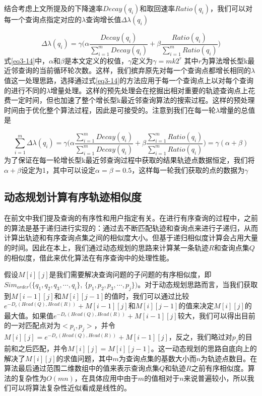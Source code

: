 结合考虑上文所提及的下降速率$Decay(q_i)$和取回速率$Ratio(q_i)$，我们可以对每一个查询点指定对应的$\lambda$查询增长值$\Delta\lambda(q_i)$

\begin{equation}
\label{eq3-14}
\Delta\lambda(q_i) = \gamma\big( \alpha\frac{Decay(q_i)}{\sum_{i=1}^{m}Decay(q_i)} + \beta\frac{Ratio(q_i)}{\sum_{i=1}^{m}Ratio(q_i)} \big)
\end{equation}
式\ref{eq3-14}中，$\alpha$和$\beta$是本文定义的权值，$\gamma$定义为$\gamma = mk2^{r}$ 其中$r$为算法增长型k最近邻查询的当前循环轮次数。这样，我们摈弃原先对每一个查询点都增长相同的$\lambda$值这一处理思路，选择通过式\ref{eq3-14}的方法应用于每一个查询点上以对每个查询的进行不同的$\lambda$增量处理。这样的预先处理会在挖掘出相对重要的轨迹查询点上花费一定时间，但也加速了整个增长型k最近邻查询算法的搜索过程。这样的预处理时间由于优化整个算法过程，因此是可接受的。注意到我们在每一轮$\lambda$增量的总值是

\begin{displaymath}
\sum_{i=1}^{m}\Delta\lambda(q_i)=\gamma\big( \alpha\frac{\sum_{i=1}^{m}Decay(q_i)}{\sum_{i=1}^{m}Decay(q_i)} + \beta\frac{\sum_{i=1}^{m}Ratio(q_i)}{\sum_{i=1}^{m}Ratio(q_i)} \big)=\gamma(\alpha+\beta)
\end{displaymath}
为了保证在每一轮增长型k最近邻查询过程中获取的结果轨迹点数据恒定，我们将$\alpha+\beta$设定为1，其中可以设定$\alpha=\beta=0.5$，这样每一轮我们获取的点的数据为$\gamma$

\subsection{动态规划计算有序轨迹相似度}
\label{subsec:dp-order-sim}
在前文中我们提及查询的有序性和用户指定有关。在进行有序查询的过程中，之前的算法是基于递归进行实现的：通过去不断匹配轨迹和查询点来进行子递归，从而计算出轨迹和有序查询点集之间的相似度大小。但基于递归相似度计算会占用大量的时间。因此在本上，我们通过动态规划的思路来计算某一条轨迹$R$和查询点集$Q$的相似度，借此来优化算法在有序查询中的处理性能。

假设$M[i][j]$是我们需要解决查询问题的子问题的有序相似度，即$Sim_{order}(\{q_1,q_2,q_3,\cdots,q_i\}$, $\{p_1,p_2,p_3,\cdots,p_j\})$。对于动态规划思路而言，当我们获取到$M[i-1][j]$和$M[i][j-1]$的值时，我们可以通过比较$e^{-D_{e}(Head(Q),Head(R))} + M[i-1][j]$和$M[i][j-1]$的值来决定$M[i][j]$的最大值。如果值$e^{-D_{e}(Head(Q),Head(R))} + M[i-1][j]$较大，我们可以得出目前的一对匹配点对为$<p_i, p_j>$，并令$M[i][j] = e^{-D_{e}(Head(Q),Head(R))} + M[i-1][j]$，反之，我们略过对$p_j$的目前和之后匹配，并令$M[i][j]=M[i][j-1]$。这一动态规划的思路自底向上的解决了$M[i][j]$的求值问题，其中$m$为查询点集的基数大小而$n$为轨迹点数目。在算法最后通过范围二维数组中的值来表示查询点集$Q$和轨迹$R$之前有序相似度。算法的复杂性为$O(mn)$，在具体应用中由于$m$的值相对于$n$来说普遍较小，所以我们可以将算法复杂性近似看成是线性的。

